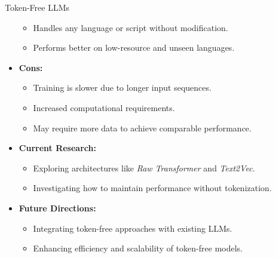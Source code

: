 \begin{frame}[allowframebreaks]{Token-Free LLMs}
\begin{itemize}
\begin{itemize}
            \item Handles any language or script without modification.
            \item Performs better on low-resource and unseen languages.
        \end{itemize}
        \item \textbf{Cons:}
        \begin{itemize}
            \item Training is slower due to longer input sequences.
            \item Increased computational requirements.
            \item May require more data to achieve comparable performance.
        \end{itemize}
    \end{itemize}
\framebreak
    \begin{itemize}
        \item \textbf{Current Research:}
        \begin{itemize}
            \item Exploring architectures like \textit{Raw Transformer} and \textit{Text2Vec}.
            \item Investigating how to maintain performance without tokenization.
        \end{itemize}
        \item \textbf{Future Directions:}
        \begin{itemize}
            \item Integrating token-free approaches with existing LLMs.
            \item Enhancing efficiency and scalability of token-free models.
        \end{itemize}
    \end{itemize}
\end{frame}